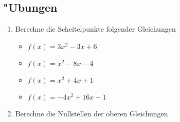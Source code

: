 \subsection{"Ubungen}

\begin{enumerate}
\item Berechne die Scheitelpunkte folgender Gleichungen
\begin{itemize}
\item $f(x) = 3x^2 - 3x + 6$
\item $f(x) = x^2 - 8x - 4$
\item $f(x) = x^2 + 4x + 1$
\item $f(x) = -4x^2 + 16x - 1$
\end{itemize}
\item Berechne die Nullstellen der oberen Gleichungen
\end{enumerate}
